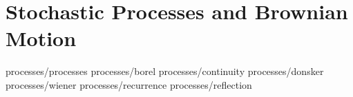 \chapter	{Stochastic Processes and Brownian Motion}

	{processes/processes}
	{processes/borel}
	{processes/continuity}
	{processes/donsker}
	{processes/wiener}
	{processes/recurrence}
	{processes/reflection}
